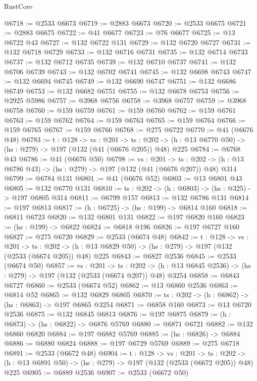 \begin{lexlean}{RustCore}
\begin{coremodule}
@6718 := @2533 @6673
@6719 := @2883 @6673
@6720 := @2533 @6675
@6721 := @2883 @6675
@6722 := @41 @6677
@6723 := @76 @6677
@6725 := @13 @6722 @43
@6727 := @132 @6722 @131
@6729 := @132 @6720 @6727
@6731 := @132 @6718 @6729
@6733 := @132 @6716 @6731
@6735 := @132 @6714 @6733
@6737 := @132 @6712 @6735
@6739 := @132 @6710 @6737
@6741 := @132 @6706 @6739
@6743 := @132 @6702 @6741
@6745 := @132 @6698 @6743
@6747 := @132 @6694 @6745
@6749 := @132 @6690 @6747
@6751 := @132 @6686 @6749
@6753 := @132 @6682 @6751
@6755 := @132 @6678 @6753
@6756 := @2925 @5986
@6757 := @3968 @6756
@6758 := @3968 @6757
@6759 := @3968 @6758
@6760 := @159 @6759
@6761 := @159 @6760
@6762 := @159 @6761
@6763 := @159 @6762
@6764 := @159 @6763
@6765 := @159 @6764
@6766 := @159 @6765
@6767 := @159 @6766
@6768 := @275 @6722
@6770 := @41 (@6676 @48)
@6783 := {t : @128} ->
  {vs : @201} ->
  {ts : @202} -> (h : @13 @6770 @50) -> (hs : @279) -> @197 (@132 (@41 (@6676 @205)) @48) @225
@6784 := @6768 @43
@6786 := @41 (@6676 @50)
@6798 := {vs : @201} ->
  {ts : @202} -> (h : @13 @6786 @43) -> (hs : @279) -> @197 (@132 (@41 (@6676 @207)) @48) @314
@6799 := @6784 @131
@6801 := @41 (@6676 @52)
@6803 := @13 @6801 @43
@6805 := @132 @6770 @131
@6810 := {ts : @202} -> (h : @6803) -> (hs : @325) -> @197 @6805 @314
@6811 := @6799 @157
@6813 := @132 @6786 @131
@6814 := @197 @6813
@6817 := (h : @6725) -> (hs : @199) -> @6814 @160
@6818 := @6811 @6723
@6820 := @132 @6801 @131
@6822 := @197 @6820 @160
@6823 := (hs : @199) -> @6822
@6824 := @6818 @196
@6826 := @197 @6727 @160
@6827 := @275 @6720
@6829 := @2533 (@6674 @48)
@6842 := {t : @128} ->
  {vs : @201} ->
  {ts : @202} -> (h : @13 @6829 @50) -> (hs : @279) -> @197 (@132 (@2533 (@6674 @205)) @48) @225
@6843 := @6827 @2536
@6845 := @2533 (@6674 @50)
@6857 := {vs : @201} ->
  {ts : @202} -> (h : @13 @6845 @2536) -> (hs : @279) -> @197 (@132 (@2533 (@6674 @207)) @48) @3254
@6858 := @6843 @6727
@6860 := @2533 (@6674 @52)
@6862 := @13 @6860 @2536
@6863 := @6814 @52
@6865 := @132 @6829 @6805
@6870 := {ts : @202} -> (h : @6862) -> (hs : @6863) -> @197 @6865 @3254
@6871 := @6858 @160
@6873 := @13 @6720 @2536
@6875 := @132 @6845 @6813
@6876 := @197 @6875
@6879 := (h : @6873) -> (hs : @6822) -> @6876 @5769
@6880 := @6871 @6721
@6882 := @132 @6860 @6820
@6884 := @197 @6882 @5769
@6885 := (hs : @6826) -> @6884
@6886 := @6880 @6824
@6888 := @197 @6729 @5769
@6889 := @275 @6718
@6891 := @2533 (@6672 @48)
@6904 := {t : @128} ->
  {vs : @201} ->
  {ts : @202} -> (h : @13 @6891 @50) -> (hs : @279) -> @197 (@132 (@2533 (@6672 @205)) @48) @225
@6905 := @6889 @2536
@6907 := @2533 (@6672 @50)

\end{coremodule}
\end{lexlean}
